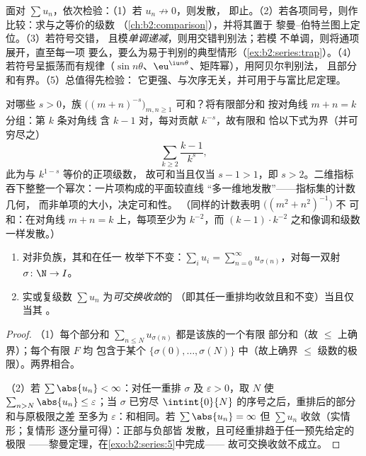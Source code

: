 \begin{method}[选择判别法]\label{met:b2:series:choosing}
面对 $\sum u_n$，依次检验：（1）若 $u_n \not\to 0$，则发散，
即止。（2）若各项同号，则作比较：求与之等价的级数
（\cref{ch:b2:comparison}），并将其置于
黎曼--伯特兰图上定位。（3）若符号交错，
且模\emph{单调递减}，则用交错判别法；若模
不单调，则将通项展开，直至每一项
要么，要么为易于判别的典型情形（\cref{ex:b2:series:trap}）。（4）
若符号呈振荡而有规律（$\sin
n\theta$、$\eu^{\iu n\theta}$、矩阵幂），用阿贝尔判别法，
且部分和有界。（5）总值得先检验：
它更强、与次序无关，并可用于与富比尼定理。
\end{method}

\begin{example}[按对角线计数判别可和性]\label{ex:b2:series:diagonalcount}
对哪些 $s > 0$，族
$\bigl((m + n)^{-s}\bigr)_{m, n \geq 1}$ 可和？将有限部分和
按对角线 $m + n = k$ 分组：第 $k$ 条对角线
含 $k - 1$ 对，每对贡献 $k^{-s}$，故有限和
恰以下式为界（并可穷尽之）
\[
\sum_{k \geq 2} \frac{k - 1}{k^{s}} ,
\]
此为与 $k^{1-s}$ 等价的正项级数，
故可和当且仅当 $s - 1 > 1$，即 $s > 2$。二维指标
吞下整整一个幂次：一片项构成的平面较直线
“多一维地发散”——指标集的计数几何，
而非单项的大小，决定可和性。
（同样的计数表明 $\bigl((m^2 + n^2)^{-1}\bigr)$ 不
可和：在对角线 $m + n = k$ 上，每项至少为
$k^{-2}$，而 $(k-1)\cdot k^{-2}$ 之和像调和级数
一样发散。）
\end{example}

\begin{theorem}[可和性与次序]\label{thm:b2:series:rearrangement}
\begin{enumerate}
  \item 对非负族，其和在任一
        枚举下不变：$\sum_{i} u_i = \sum_{n=0}^{\infty}
        u_{\sigma(n)}$，对每一双射 $\sigma \colon \N \to I$。
  \item 实或复级数 $\sum u_n$ 为\emph{可交换收敛}的
        （即其任一重排均收敛且和不变）当且仅当其
        。
\end{enumerate}
\end{theorem}

\begin{proof}
（1）每个部分和 $\sum_{n \leq N} u_{\sigma(n)}$ 都是该族的一个有限
部分和（故 $\leq$ 上确界）；每个有限 $F$ 均
包含于某个 $\{\sigma(0), \dots, \sigma(N)\}$ 中（故上确界
$\leq$ 级数的极限）。两界相合。

（2）若 $\sum\abs{u_n} < \infty$：对任一重排 $\sigma$ 及
$\varepsilon > 0$，取 $N$ 使 $\sum_{n > N}\abs{u_n} \leq
\varepsilon$；当 $\sigma$ 已穷尽
$\intint{0}{N}$ 的序号之后，重排后的部分和与原极限之差
至多为 $\varepsilon$：和相同。若 $\sum
\abs{u_n} = \infty$ 但 $\sum u_n$ 收敛（实情形；复情形
逐分量可得）：正部与负部皆
发散，且可经重排趋于任一预先给定的极限
——黎曼定理，在\cref{exo:b2:series:5}中完成——
故可交换收敛不成立。
\end{proof}

